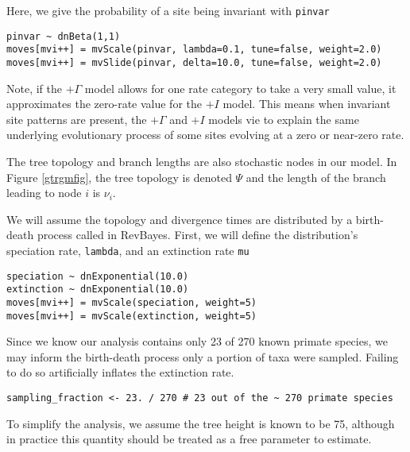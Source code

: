 Here, we give the probability of a site being invariant with {\tt pinvar}
{\tt \begin{snugshade*}
\begin{lstlisting}
pinvar ~ dnBeta(1,1)
moves[mvi++] = mvScale(pinvar, lambda=0.1, tune=false, weight=2.0)
moves[mvi++] = mvSlide(pinvar, delta=10.0, tune=false, weight=2.0)
\end{lstlisting}
\end{snugshade*}}

Note, if the $+\Gamma$ model allows for one rate category to take a very small value, it approximates the zero-rate value for the $+I$ model.
This means when invariant site patterns are present, the $+\Gamma$ and $+I$ models vie to explain the same underlying evolutionary process of some sites evolving at a zero or near-zero rate.

The tree topology and branch lengths are also stochastic nodes in our model. 
In Figure \ref{gtrgmfig}, the tree topology is denoted $\Psi$ and the length of the branch leading to node $i$ is $\nu_i$.

We will assume the topology and divergence times are distributed by a birth-death process called  in RevBayes.
First, we will define the distribution's speciation rate, {\tt lambda}, and an extinction rate {\tt mu}

{\tt \begin{snugshade*}
\begin{lstlisting}
speciation ~ dnExponential(10.0)
extinction ~ dnExponential(10.0)
moves[mvi++] = mvScale(speciation, weight=5)
moves[mvi++] = mvScale(extinction, weight=5)
\end{lstlisting}
\end{snugshade*}}

Since we know our analysis contains only 23 of 270 known primate species, we may inform the birth-death process only a portion of taxa were sampled.
Failing to do so artificially inflates the extinction rate.

{\tt \begin{snugshade*}
\begin{lstlisting}
sampling_fraction <- 23. / 270 # 23 out of the ~ 270 primate species
\end{lstlisting}
\end{snugshade*}}

To simplify the analysis, we assume the tree height is known to be 75, although in practice this quantity should be treated as a free parameter to estimate.

